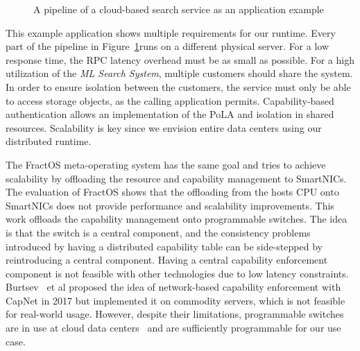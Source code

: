 \begin{figure}
  \caption{\label{fig:application} A pipeline of a cloud-based search service as an application example}
\end{figure}
This example application shows multiple requirements for our runtime. Every part of the pipeline in Figure~\ref{fig:application}\@ runs on a different physical server. For a low response time, the \ac{RPC} latency overhead must be as small as possible. For a high utilization of the \emph{\ac{ML} Search System}, multiple customers should share the system. In order to ensure isolation between the customers, the service must only be able to access storage objects, as the calling application permits. Capability-based authentication allows an implementation of the \ac{PoLA} and isolation in shared resources. Scalability is key since we envision entire data centers using our distributed runtime.

The FractOS meta-operating system has the same goal and tries to achieve scalability by offloading the resource and capability management to SmartNICs. The evaluation of FractOS shows that the offloading from the hosts \ac{CPU} onto SmartNICs does not provide performance and scalability improvements. This work offloads the capability management onto programmable switches. The idea is that the switch is a central component, and the consistency problems introduced by having a distributed capability table can be side-stepped by reintroducing a central component. Having a central capability enforcement component is not feasible with other technologies due to low latency constraints. Burtsev \ et al {} proposed the idea of network-based capability enforcement with CapNet in 2017 but implemented it on commodity servers, which is not feasible for real-world usage. However, despite their limitations, programmable switches are in use at cloud data centers~\cite{zhaogengliWhitePaperBaidu2022, panSailfishAcceleratingCloudscale2021} and are sufficiently programmable for our use case.

